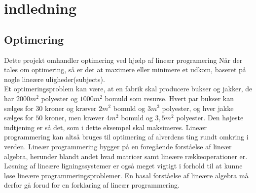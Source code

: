 \chapter{indledning}
\section{Optimering}
Dette projekt omhandler optimering ved hjælp af lineær programering %
Når der tales om optimering, så er det at maximere eller minimere et udkom, baseret på nogle lineære uligheder(subjects). \\
Et optimeringsproblem kan være, at en fabrik skal producere bukser og jakker, de har $2000m^2$ polyester og $1000m^2$ bomuld som resurse.
Hvert par bukser kan sælges for $30$ kroner og kræver $2m^2$ bomuld og $3m^3$ polyester, og hver jakke sælges for $50$ kroner, men kræver $4m^2$ bomuld og $3,5m^2$ polyester. 
Den højeste indtjening er så det, som i dette eksempel skal maksimeres. 
Lineær programmering kan altså bruges til optimering af alverdens ting rundt omkring i verden.
Lineær programmering bygger på en foregående forståelse af lineær algebra, herunder blandt andet hvad matricer samt lineære rækkeoperationer er.
Løsning af lineære ligningssystemer er også meget vigtigt i forhold til at kunne løse lineære programmeringsproblemer.
En basal forståelse af lineære algebra må derfor gå forud for en forklaring af lineær programmering. 
\\
